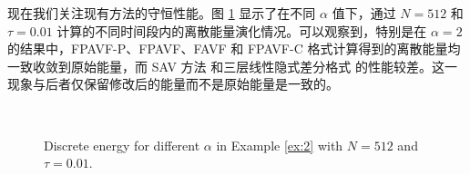 现在我们关注现有方法的守恒性能。图 \ref{fig:3} 显示了在不同 $\alpha$ 值下，通过 $N=512$ 和 $\tau=0.01$ 计算的不同时间段内的离散能量演化情况。可以观察到，特别是在 $\alpha=2$ 的结果中，FPAVF-P、FPAVF、FAVF 和 FPAVF-C 格式计算得到的离散能量均一致收敛到原始能量，而 SAV 方法 \cite{chengConvergenceEnergyconservingScheme2022} 和三层线性隐式差分格式 \cite{ranLinearlyImplicitConservative2016} 的性能较差。这一现象与后者仅保留修改后的能量而不是原始能量是一致的。

\begin{figure}[H]
	\begin{center}
	\\
	\caption{Discrete energy for different $\alpha$ in Example \ref{ex:2} with $N = 512$ and $\tau=0.01$.} \label{fig:3}
	\end{center}
	\end{figure}

